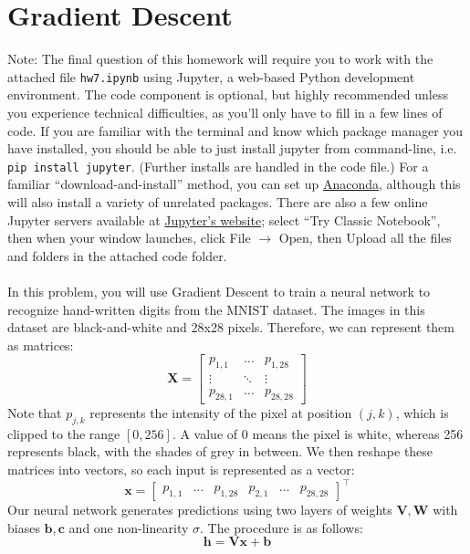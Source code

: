 \documentclass{article}
\begin{document}
\section{Gradient Descent}
Note: The final question of this homework will require you to work with the attached file \verb|hw7.ipynb| using Jupyter, a web-based Python development environment. The code component is optional, but highly recommended unless you experience technical difficulties, as you'll only have to fill in a few lines of code. If you are familiar with the terminal and know which package manager you have installed, you should be able to just install jupyter from command-line, i.e. \verb|pip install jupyter|. (Further installs are handled in the code file.) For a familiar ``download-and-install'' method, you can set up \href{https://www.anaconda.com/products/individual#download-section}{{\color{blue} Anaconda}}, although this will also install a variety of unrelated packages. There are also a few online Jupyter servers available at \href{https://jupyter.org/try}{{\color{blue} Jupyter's website}}; select ``Try Classic Notebook'', then when your window launches, click File $\rightarrow$ Open, then Upload all the files and folders in the attached code folder.  \\\\
In this problem, you will use Gradient Descent to train a neural network to recognize hand-written digits from the MNIST dataset. The images in this dataset are black-and-white and 28x28 pixels. Therefore, we can represent them as matrices: $$\mathbf{X} = \begin{bmatrix} p_{1,1} & \hdots & p_{1,28} \\ \vdots & \ddots & \vdots \\ p_{28,1} & \hdots & p_{28,28}\end{bmatrix}$$ Note that $p_{j, k}$ represents the intensity of the pixel at position $(j, k)$, which is clipped to the range $[0, 256]$. A value of 0 means the pixel is white, whereas 256 represents black, with the shades of grey in between. We then reshape these matrices into vectors, so each input is represented as a vector:
$$\mathbf{x} = \begin{bmatrix} p_{1, 1} & \hdots & p_{1, 28} & p_{2, 1} & \hdots & p_{28, 28} \end{bmatrix}^{\top}$$
Our neural network generates predictions using two layers of weights $\mathbf{V}, \mathbf{W}$ with biases $\mathbf{b}, \mathbf{c}$ and one non-linearity $\sigma$. The procedure is as follows:
$$\mathbf{h} = \mathbf{Vx} + \mathbf{b}$$
\end{document}
